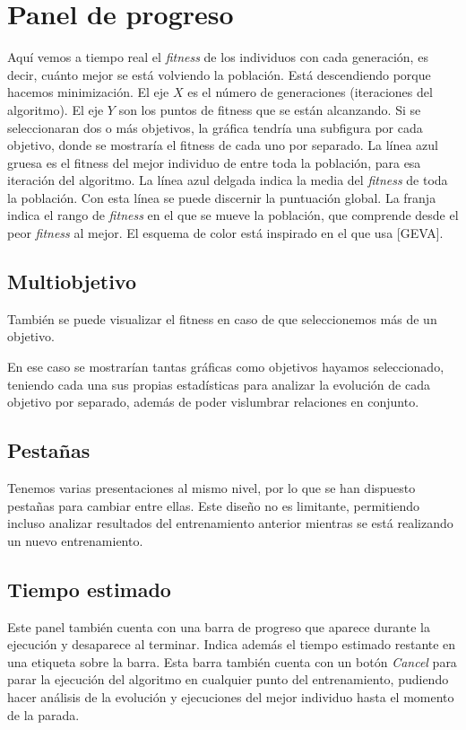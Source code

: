 \section{Panel de progreso}


Aquí vemos a tiempo real el \textit{fitness} de los individuos con cada generación, es decir, cuánto mejor se está volviendo la población. Está descendiendo porque hacemos minimización.
El eje $X$ es el número de generaciones (iteraciones del algoritmo). El eje $Y$ son los puntos de fitness que se están alcanzando. Si se seleccionaran dos o más objetivos, la gráfica tendría una subfigura por cada objetivo, donde se mostraría el fitness de cada uno por separado.
La línea azul gruesa es el fitness del mejor individuo de entre toda la población, para esa iteración del algoritmo.
La línea azul delgada indica la media del \textit{fitness} de toda la población. Con esta línea se puede discernir la puntuación global.
La franja indica el rango de \textit{fitness} en el que se mueve la población, que comprende desde el peor \textit{fitness} al mejor.
El esquema de color está inspirado en el que usa [GEVA].

\subsection{Multiobjetivo}
También se puede visualizar el fitness en caso de que seleccionemos más de un objetivo.


En ese caso se mostrarían tantas gráficas como objetivos hayamos seleccionado, teniendo cada una sus propias estadísticas para analizar la evolución de cada objetivo por separado, además de poder vislumbrar relaciones en conjunto.



\subsection{Pestañas}
Tenemos varias presentaciones al mismo nivel, por lo que se han dispuesto pestañas para cambiar entre ellas. Este diseño no es limitante, permitiendo incluso analizar resultados del entrenamiento anterior mientras se está realizando un nuevo entrenamiento.



\subsection{Tiempo estimado}
Este panel también cuenta con una barra de progreso que aparece durante la ejecución y desaparece al terminar. Indica además el tiempo estimado restante en una etiqueta sobre la barra. Esta barra también cuenta con un botón \textit{Cancel} para parar la ejecución del algoritmo en cualquier punto del entrenamiento, pudiendo hacer análisis de la evolución y ejecuciones del mejor individuo hasta el momento de la parada.



